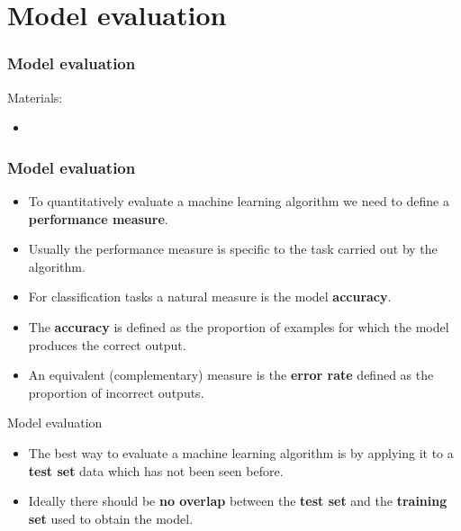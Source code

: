 \documentclass[notes]{beamer}          %
\newif\iffull
\begin{document}
\fi %

\iffull %

\section{Model evaluation}

\begin{frame}
\frametitle{Model evaluation}
Materials:
\begin{itemize}
    \item \cite{ROC}
\end{itemize}
\end{frame}


\begin{frame}
\frametitle{Model evaluation}
    \begin{itemize}
        \item To quantitatively evaluate a machine learning algorithm we need to define a {\bf performance measure}.
        \item Usually the performance measure is specific to the task carried out by the algorithm.
        \item For classification tasks a natural measure is the model {\bf accuracy}.
        \item The {\bf accuracy} is defined as the proportion of examples for which the model produces the correct output.
        \item An equivalent (complementary) measure is the {\bf error rate} defined as the proportion of incorrect outputs.
    \end{itemize}
\end{frame}

\begin{frame}{Model evaluation}
    \begin{itemize}
        \item The best way to evaluate a machine learning algorithm is by applying it to a {\bf test set} data which has not been seen before.
        \item Ideally there should be {\bf no overlap} between the {\bf test set} and  the {\bf training set} used to obtain the model.
    \end{itemize}
\end{frame}
\end{document}
